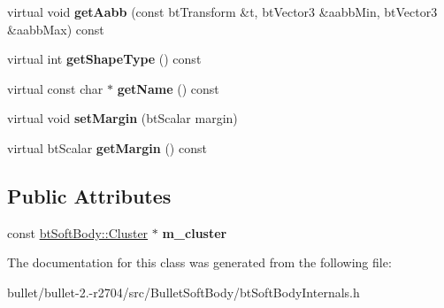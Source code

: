 \begin{DoxyCompactItemize}
\item 
\hypertarget{classbt_soft_cluster_collision_shape_a19628f20019cb6b8514c78b5bada1c42}{virtual void {\bfseries get\+Aabb} (const bt\+Transform \&t, bt\+Vector3 \&aabb\+Min, bt\+Vector3 \&aabb\+Max) const }\label{classbt_soft_cluster_collision_shape_a19628f20019cb6b8514c78b5bada1c42}

\item 
\hypertarget{classbt_soft_cluster_collision_shape_a83fd62a36f0af64934901391df4230f5}{virtual int {\bfseries get\+Shape\+Type} () const }\label{classbt_soft_cluster_collision_shape_a83fd62a36f0af64934901391df4230f5}

\item 
\hypertarget{classbt_soft_cluster_collision_shape_a4bac3db6c3a397cdc2e34d37d9184612}{virtual const char $\ast$ {\bfseries get\+Name} () const }\label{classbt_soft_cluster_collision_shape_a4bac3db6c3a397cdc2e34d37d9184612}

\item 
\hypertarget{classbt_soft_cluster_collision_shape_a0465940b33f7c7023ccd86ffe7b7935d}{virtual void {\bfseries set\+Margin} (bt\+Scalar margin)}\label{classbt_soft_cluster_collision_shape_a0465940b33f7c7023ccd86ffe7b7935d}

\item 
\hypertarget{classbt_soft_cluster_collision_shape_ab51fb94d625457a38240b1e35a89ec25}{virtual bt\+Scalar {\bfseries get\+Margin} () const }\label{classbt_soft_cluster_collision_shape_ab51fb94d625457a38240b1e35a89ec25}

\end{DoxyCompactItemize}
\subsection*{Public Attributes}
\begin{DoxyCompactItemize}
\item 
\hypertarget{classbt_soft_cluster_collision_shape_a8effbadda0ac7a03655ff3b5631815ac}{const \hyperlink{structbt_soft_body_1_1_cluster}{bt\+Soft\+Body\+::\+Cluster} $\ast$ {\bfseries m\+\_\+cluster}}\label{classbt_soft_cluster_collision_shape_a8effbadda0ac7a03655ff3b5631815ac}

\end{DoxyCompactItemize}


The documentation for this class was generated from the following file\+:\begin{DoxyCompactItemize}
\item 
bullet/bullet-\/2.-\/r2704/src/\+Bullet\+Soft\+Body/bt\+Soft\+Body\+Internals.\+h\end{DoxyCompactItemize}
